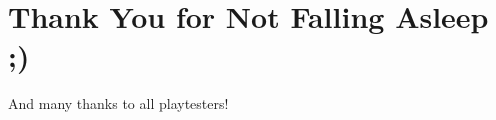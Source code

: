 \documentclass[presentation]{beamer}
\begin{document}
\section{Thank You for Not Falling Asleep ;)}

\begin{frame}{\insertsection}
	And many thanks to all playtesters!
\end{frame}
\end{document}
